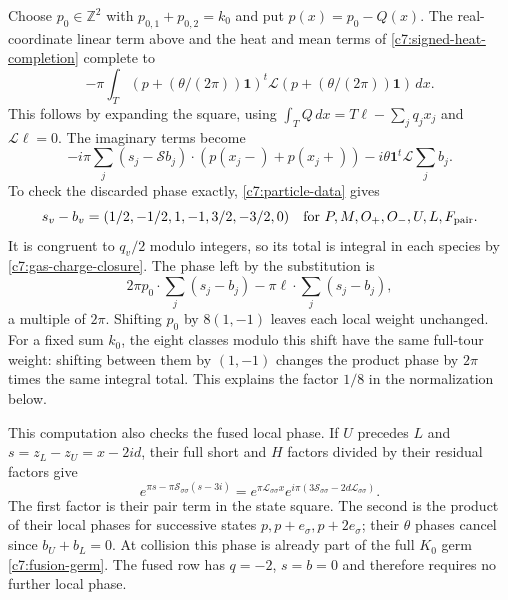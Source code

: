 Choose $p_0\in\mathbb Z^2$ with $p_{0,1}+p_{0,2}=k_0$ and put
$p(x)=p_0-Q(x)$.  The real-coordinate linear term above and the heat and
mean terms of \eqref{c7:signed-heat-completion} complete to
\[
-\pi\int_T(p+(\theta/(2\pi))\mathbf1)^t\mathcal L
                 (p+(\theta/(2\pi))\mathbf1)\,dx.
\]
This follows by expanding the square, using
$\int_TQ\,dx=T\boldsymbol\ell-\sum_jq_jx_j$ and
$\mathcal L\boldsymbol\ell=0$.  The imaginary terms become
\[
-i\pi\sum_j(s_j-\mathcal S b_j)\cdot(p(x_j-)+p(x_j+))
-i\theta\mathbf1^t\mathcal L\sum_j b_j.
\]
To check the discarded phase exactly, \eqref{c7:particle-data} gives
\[
s_v-b_v=(1/2,-1/2,1,-1,3/2,-3/2,0)
\quad\text{for }P,M,O_+,O_-,U,L,F_{\rm pair}.
\]
It is congruent to $q_v/2$ modulo integers, so its total is integral in
each species by \eqref{c7:gas-charge-closure}.  The phase left by the
substitution is
\[
2\pi p_0\cdot\sum_j(s_j-b_j)
-\pi\boldsymbol\ell\cdot\sum_j(s_j-b_j),
\]
a multiple of $2\pi$.  Shifting $p_0$ by $8(1,-1)$ leaves each local weight
unchanged.  For a fixed sum $k_0$, the eight classes modulo this shift have
the same full-tour weight: shifting between them by $(1,-1)$ changes the
product phase by $2\pi$ times the same integral total.  This explains the
factor $1/8$ in the normalization below.

This computation also checks the fused local phase.  If $U$ precedes $L$
and $s=z_L-z_U=x-2id$, their full short and $H$ factors divided by their
residual factors give
\[
e^{\pi s-\pi\mathcal S_{\sigma\sigma}(s-3i)}
=e^{\pi\mathcal L_{\sigma\sigma}x}
 e^{i\pi(3\mathcal S_{\sigma\sigma}-2d\mathcal L_{\sigma\sigma})}.
\]
The first factor is their pair term in the state square.  The second is the
product of their local phases for successive states
$p,p+e_\sigma,p+2e_\sigma$; their $\theta$ phases cancel since $b_U+b_L=0$.
At collision this phase is already part of the full $K_0$ germ
\eqref{c7:fusion-germ}.  The fused row has $q=-2$, $s=b=0$ and therefore
requires no further local phase.

